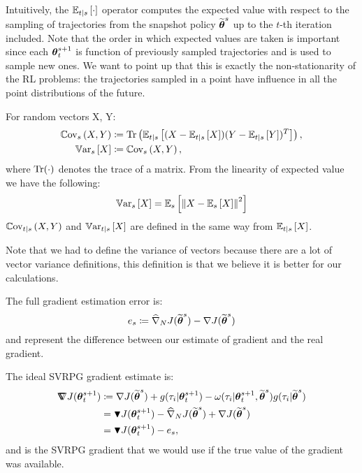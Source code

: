 Intuitively, the $\Ets{\cdot}$ operator computes the expected value with respect to the sampling of trajectories from the snapshot policy $\wt{\vtheta}^s$ up to the $t$-th iteration included. Note that the order in which expected values are taken is important since each $\vtheta_{t}^{s+1}$ is function of previously sampled trajectories and is used to sample new ones.
We want to point up that this is exactly the non-stationarity of the \acs{RL} problems: the trajectories sampled in a point have influence in all the point distributions of the future.

\begin{definition}\label{def:var}
	For random vectors X, Y:
	\begin{align*}
	\Covs{X}{Y} &\coloneqq \Tr\left(\Ets{(X-\Ets{X})(Y-\Ets{Y})^T}\right), \\
	\Vars{X} &\coloneqq \Covs{X}{Y},
	\end{align*}
	where $\Tr(\cdot)$ denotes the trace of a matrix. From the linearity of expected value we have the following:
	\begin{equation}\label{neweq:1}
	\Vars{X} = \Es{\norm[]{X-\Es{X}}^2}
	\end{equation}
	$\Covts[t]{X}{Y}$ and $\Varts[t]{X}$ are defined in the same way from $\Ets[t]{X}$.
\end{definition}
Note that we had to define the variance of vectors because there are a lot of vector variance definitions, this definition is that we  believe it is better for our calculations. 
\begin{definition}
	The full gradient estimation error is:
	\[
	e_s \coloneqq \gradApp{\wt{\vtheta}^s}{N} - \gradJ{\wt{\vtheta}^s} 
	\]
	and represent the difference between our estimate of gradient and the real gradient.
\end{definition}

\begin{definition}\label{def:ideal}
	The ideal \acs{SVRPG} gradient estimate is:
	\begin{align*}
	\gradIdeal{\vtheta_t^{s+1}} &\coloneqq 
	\gradJ{\wt{\vtheta}^s}
	+ g(\tau_i|\vtheta^{s+1}_t)
	- \omega(\tau_i|\vtheta^{s+1}_t, \wt{\vtheta}^s) g(\tau_i|\wt{\vtheta}^s)
	\\
	&= \gradBlack{\vtheta_t^{s+1}} - \gradApp{\wt{\vtheta}^s}{N} + \gradJ{\wt{\vtheta}^s} \\
	&= \gradBlack{\vtheta_t^{s+1}} - e_s,
	\end{align*} and is the SVRPG gradient that we would use if the true value of the gradient was available.
\end{definition}


